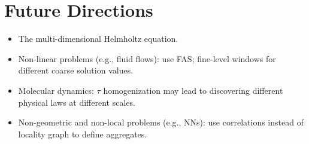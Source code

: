 \documentclass{article}
\begin{document}
\section{Future Directions}
\begin{itemize}
	\item The multi-dimensional Helmholtz equation.
	\item Non-linear problems (e.g., fluid flows): use FAS; fine-level windows for different coarse solution values.
	\item Molecular dynamics: $\tau$ homogenization may lead to discovering different physical laws at different scales.
	\item Non-geometric and non-local problems (e.g., NNs): use correlations instead of locality graph to define aggregates.
\end{itemize}



\end{document}
